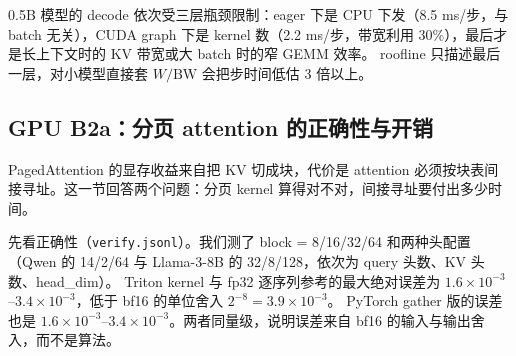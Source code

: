 \documentclass[11pt,a4paper]{ctexart}
\begin{document}
\begin{findingbox}[：roofline]
0.5B 模型的 decode 依次受三层瓶颈限制：eager 下是 CPU 下发（8.5 ms/步，与 batch 无关），CUDA graph 下是 kernel 数（2.2 ms/步，带宽利用 30\%），最后才是长上下文时的 KV 带宽或大 batch 时的窄 GEMM 效率。
roofline 只描述最后一层，对小模型直接套 $W/\text{BW}$ 会把步时间低估 3 倍以上。
\end{findingbox}

\subsection{GPU B2a：分页 attention 的正确性与开销}
PagedAttention 的显存收益来自把 KV 切成块，代价是 attention 必须按块表间接寻址。这一节回答两个问题：分页 kernel 算得对不对，间接寻址要付出多少时间。

先看正确性（\texttt{verify.jsonl}）。我们测了 block = 8/16/32/64 和两种头配置（Qwen 的 14/2/64 与 Llama-3-8B 的 32/8/128，依次为 query 头数、KV 头数、head\_dim）。
Triton kernel 与 fp32 逐序列参考的最大绝对误差为 $1.6\times10^{-3}$--$3.4\times10^{-3}$，低于 bf16 的单位舍入 $2^{-8}=3.9\times10^{-3}$。
PyTorch gather 版的误差也是 $1.6\times10^{-3}$--$3.4\times10^{-3}$。两者同量级，说明误差来自 bf16 的输入与输出舍入，而不是算法。
\end{document}
